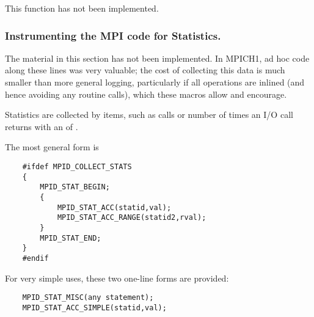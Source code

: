 \documentclass{article}
\begin{document}
This function has not been implemented.

\subsubsection{Instrumenting the MPI code for Statistics.}
The material in this section has not been implemented.  In MPICH1, ad
hoc code along these lines was very valuable; the cost of collecting
this data is much smaller than more general logging, particularly if
all operations are inlined (and hence avoiding any routine calls),
which these macros allow and encourage.  

Statistics are collected by items, such as  calls or
number of times an I/O call returns with an  of
.  

The most general form is
\begin{verbatim}
    #ifdef MPID_COLLECT_STATS
    {
        MPID_STAT_BEGIN;
        {
            MPID_STAT_ACC(statid,val);
            MPID_STAT_ACC_RANGE(statid2,rval);
        }
        MPID_STAT_END;
    }
    #endif
\end{verbatim}

For very simple uses, these two one-line forms are provided:
\begin{verbatim}
    MPID_STAT_MISC(any statement);
    MPID_STAT_ACC_SIMPLE(statid,val);
\end{verbatim}
\end{document}
